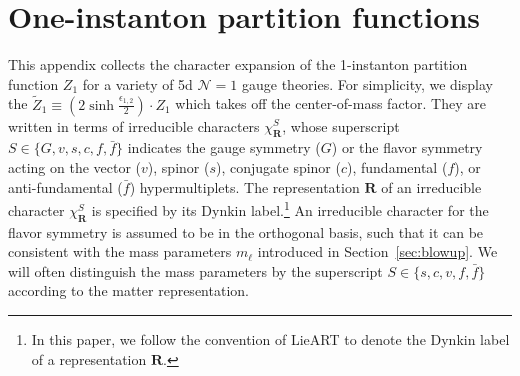 \documentclass[letterpaper, 11pt]{article}
\def\e{\epsilon}
\begin{document}
{%

\appendix
\section{One-instanton partition functions}
\label{sec:data}

This appendix collects the character expansion of the 1-instanton partition function $Z_1$ for a variety of 5d $\mathcal{N}=1$ gauge theories. For simplicity, we display the $\tilde{Z}_1 \equiv (2\sinh{\frac{\e_{1,2}}{2}}) \cdot Z_1$ which takes off the center-of-mass factor. They are written in terms of irreducible characters $\chi_{\mathbf{R}}^S$, whose superscript $S \in \{G,v,s,c,f,\bar{f}\}$ indicates the gauge symmetry ($G$) or the flavor symmetry acting on the vector ($v$), spinor ($s$), conjugate spinor ($c$), fundamental ($f$), or anti-fundamental ($\bar{f}$) hypermultiplets. The representation $\mathbf{R}$ of an irreducible character $\chi_{\mathbf{R}}^S$ is specified by its Dynkin label.\footnote{In this paper, we follow the convention of  LieART \cite{Feger:2012bs} to denote the Dynkin label of a representation $\mathbf{R}$.} An irreducible character for the flavor symmetry is assumed to be in the orthogonal basis, such that it can be consistent with the mass parameters $m_\ell$ introduced in Section~\ref{sec:blowup}. We will often distinguish the mass parameters by the superscript $S \in \{s,c,v,f,\bar{f}\}$ according to the matter representation. 

}
\end{document}
